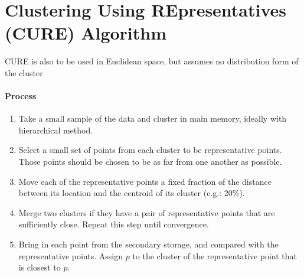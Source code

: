 \section{Clustering Using REpresentatives (CURE) Algorithm} 
CURE is also to be used in Euclidean space, but assumes no distribution form of the cluster
\paragraph{Process} 
    \begin{enumerate}
        \item Take a small sample of the data and cluster in main memory, ideally with hierarchical method. 
        \item Select a small set of points from each cluster to be representative points. Those points should be chosen to be as far from one another as possible. 
        \item Move each of the representative points a fixed fraction of the distance between its location and the centroid of its cluster (e.g.: 20\%). 
        \item Merge two clusters if they have a pair of representative points that are sufficiently close. Repeat this step until convergence. 
        \item Bring in each point from the secondary storage, and compared with the representative points. Assign $p$ to the cluster of the representative point that is closest to $p$. 
    \end{enumerate}
